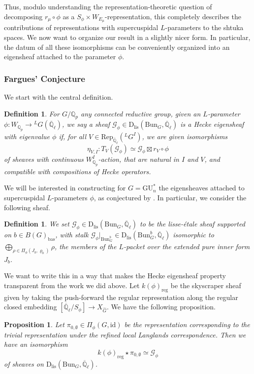 \documentclass[reqno,11pt]{amsart}
\newtheorem{proposition}[theorem]{Proposition}
\newtheorem{definition}[theorem]{Definition}
\theoremstyle{remark}
\newcommand{\GU}{\mathrm{GU}}
\newcommand{\id}{\mathrm{id}}
\newcommand{\bas}{\mathrm{bas}}
\newcommand{\Bun}{\mathrm{Bun}}
\newcommand{\Rep}{\mathrm{Rep}}
\newcommand{\Dlis}{\mathrm{D}_{\mathrm{lis}}}
\def\ol{\overline}
\def\ra{\rightarrow}
\begin{document}
Thus, modulo understanding the representation-theoretic question of decomposing $r_{\mu} \circ \phi$ as a $S_{\phi} \times W_{E_{\mu}}$-representation, this completely describes the contributions of representations with supercuspidal $L$-parameters to the shtuka spaces. We now want to organize our result in a slightly nicer form. In particular, the datum of all these isomorphisms can be conveniently organized into an eigensheaf attached to the parameter $\phi$. 
\subsubsection{Fargues' Conjecture}
We start with the central definition. 
\begin{definition}{\label{defeigsheaf}}
For $G/\mathbb{Q}_{p}$ any connected reductive group, given an $L$-parameter $\phi: W_{\mathbb{Q}_{p}} \rightarrow \phantom{}^{L}G(\ol{\mathbb{Q}}_{\ell})$, we say a sheaf $\mathcal{G}_{\phi} \in \Dlis(\Bun_{G},\ol{\mathbb{Q}}_{\ell})$ is a Hecke eigensheaf with eigenvalue $\phi$ if, for all $V \in \Rep_{\ol{\mathbb{Q}}_{\ell}}(\phantom{}^{L}G^{I})$, we are given isomorphisms
\[ \eta_{V,I}: T_{V}(\mathcal{G}_{\phi}) \simeq \mathcal{G}_{\phi} \boxtimes r_{V} \circ \phi \]
of sheaves with continuous $W_{\mathbb{Q}_{p}}^{I}$-action, that are natural in $I$ and $V$, and compatible with compositions of Hecke operators.
\end{definition}
We will be interested in constructing for $G=\GU^*_{n}$ the eigensheaves attached to supercuspidal $L$-parameters $\phi$, as conjectured by \cite[Conjecture~4.4]{Fa}. In particular, we consider the following sheaf.
\begin{definition}
We set $\mathcal{G}_{\phi} \in \Dlis(\Bun_{G},\overline{\mathbb{Q}}_{\ell})$ to be the lisse-\'etale sheaf supported on $b \in B(G)_{\bas}$, with stalk $\mathcal{G}_{\phi}|_{\Bun_{G}^{b}} \in \Dlis(\Bun_{G}^{b},\ol{\mathbb{Q}}_{\ell})$ isomorphic to  $\bigoplus_{\rho \in \Pi_{\phi}(J_{b}, \varrho_b)} \rho$, the members of the $L$-packet over the extended pure inner form $J_{b}$.
\end{definition}
We want to write this in a way that makes the Hecke eigensheaf property transparent from the work we did above. Let $k(\phi)_{\mathrm{reg}}$ be the skyscraper sheaf given by taking the push-forward the regular representation along the regular closed embedding $[\ol{\mathbb{Q}}_{\ell}/S_{\phi}] \ra X_{\hat{G}}$. We have the following proposition.
\begin{proposition}
Let $\pi_{0,\emptyset} \in \Pi_{\phi}(G,\id)$ be the representation corresponding to the trivial representation under the refined local Langlands correspondence. Then we have an isomorphism 
\[ k(\phi)_{\mathrm{reg}} \star \pi_{0,\emptyset} \simeq \mathcal{G}_{\phi} \] 
of sheaves on $\Dlis(\Bun_{G},\ol{\mathbb{Q}}_{\ell})$. 
\end{proposition}
\end{document}
